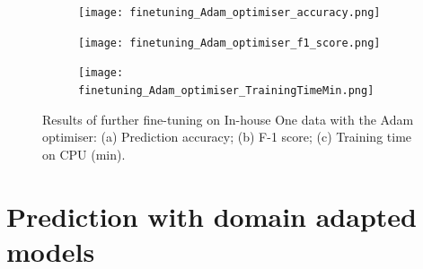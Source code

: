\documentclass[a4paper,12pt]{article}
\newcommand{\figwidthhh}{0.45\textwidth}
\newcommand{\inghamOne}{In-house One\xspace}   %
\begin{document}
	
\begin{figure}[h!]
	\begin{center}
		\begin{subfigure}[b]{\figwidthhh}
			\caption{} 
			\texttt{[image: finetuning\_Adam\_optimiser\_accuracy.png]}
		\end{subfigure}
        \hfill
		\begin{subfigure}[b]{\figwidthhh}
			\caption{}
			\texttt{[image: finetuning\_Adam\_optimiser\_f1\_score.png]}
		\end{subfigure}
        \hfill
		\begin{subfigure}[b]{\figwidthhh}
			\caption{}
			\texttt{[image: finetuning\_Adam\_optimiser\_TrainingTimeMin.png]}
		\end{subfigure}
	\end{center}                                                                
	\caption{Results of further fine-tuning on \inghamOne data with the Adam optimiser: (a) Prediction accuracy; (b) F-1 score; (c) Training time on CPU (min).
	} 
	\label{fig:res_domainAdaptation_Adam}
\end{figure}


\newpage


\section{Prediction with domain adapted models}
\end{document}
